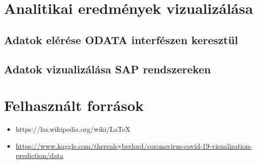 \documentclass[12pt,a4papaer]{article}
\begin{document}
    \newpage
    \section{Analitikai eredmények vizualizálása}
    \subsection{Adatok elérése ODATA interfészen keresztül}
    \subsection{Adatok vizualizálása SAP rendszereken}

    \newpage
    \section{Felhasznált források}
    \begin{itemize}
        \item https://hu.wikipedia.org/wiki/LaTeX
        \item \label{dataset_link} \url{ https://www.kaggle.com/therealcyberlord/coronavirus-covid-19-visualization-prediction/data}
    \end{itemize}
\end{document}
